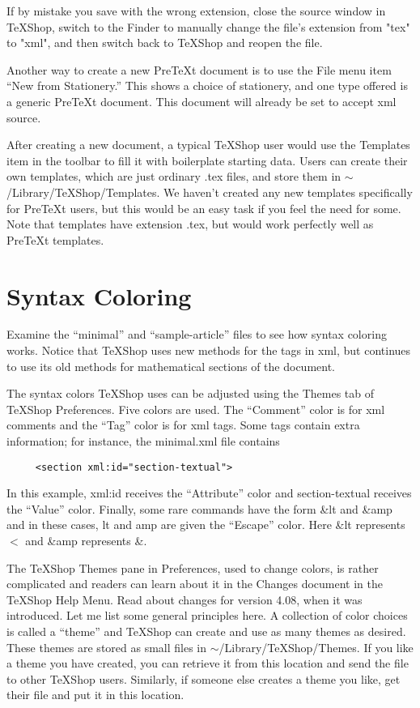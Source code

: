 \documentclass[11pt, oneside]{article}   	%
\begin{document}
If by mistake you save with the wrong extension, close the source window in TeXShop, switch to the Finder to manually change the file's extension from "tex" to "xml", and then switch back to TeXShop and reopen the file.

Another way to create a new PreTeXt document is to use the File menu item ``New from Stationery.'' This shows a choice of stationery, and one type offered is a generic PreTeXt document. This document will already be set to accept xml source.

After creating a new document, a typical TeXShop user would use the Templates item in the toolbar to fill it with boilerplate starting data. Users can create their own templates, which are just ordinary .tex files, and store them in $\sim$/Library/TeXShop/Templates. We haven't created any new templates specifically for PreTeXt users, but this would be an easy task if you feel the need for some. Note that templates have extension .tex, but would work perfectly well as PreTeXt templates.

\section{Syntax Coloring}

Examine the ``minimal'' and ``sample-article'' files to see how syntax coloring works. Notice that TeXShop uses new methods for the tags in xml, but continues to use its old methods for  mathematical sections of the document.

The syntax colors TeXShop uses can be adjusted using the Themes tab of TeXShop Preferences. Five colors are used. The ``Comment'' color is for xml comments and the ``Tag'' color is for xml tags. Some tags contain extra information; for instance, the minimal.xml file contains 
\begin{verbatim}
     <section xml:id="section-textual">
\end{verbatim}
In this example, xml:id receives the ``Attribute'' color and section-textual receives the ``Value'' color. Finally,
some rare commands have the form \&lt and \&amp and in these cases, lt and amp are given the ``Escape'' color.
Here \&lt represents $<$ and \&amp represents \&.

The TeXShop Themes pane in Preferences, used to change colors, is rather complicated and readers can learn about it in the Changes document in the TeXShop Help Menu. Read about changes for version 4.08, when it was introduced. Let me  list some general principles here. A collection of color choices is called a ``theme'' and TeXShop can create and use as many themes as desired. These themes are stored as small files in $\sim$/Library/TeXShop/Themes. If you like a theme you have created, you can retrieve it from this location and send the file to other TeXShop users. Similarly, if someone else creates a theme you like, get their file and put it in this location.
\end{document}
